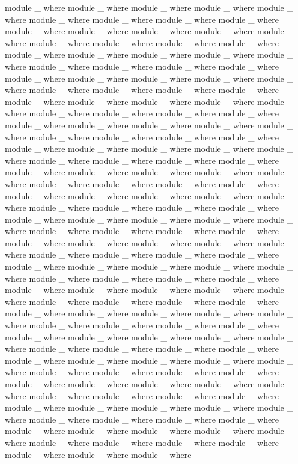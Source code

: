\documentclass{article}
\begin{document}
\begin{code}
module _ where
module _ where
module _ where
module _ where
module _ where
module _ where
module _ where
module _ where
module _ where
module _ where
module _ where
module _ where
module _ where
module _ where
module _ where
module _ where
module _ where
module _ where
module _ where
module _ where
module _ where
module _ where
module _ where
module _ where
module _ where
module _ where
module _ where
module _ where
module _ where
module _ where
module _ where
module _ where
module _ where
module _ where
module _ where
module _ where
module _ where
module _ where
module _ where
module _ where
module _ where
module _ where
module _ where
module _ where
module _ where
module _ where
module _ where
module _ where
module _ where
module _ where
module _ where
module _ where
module _ where
module _ where
module _ where
module _ where
module _ where
module _ where
module _ where
module _ where
module _ where
module _ where
module _ where
module _ where
module _ where
module _ where
module _ where
module _ where
module _ where
module _ where
module _ where
module _ where
module _ where
module _ where
module _ where
module _ where
module _ where
module _ where
module _ where
module _ where
module _ where
module _ where
module _ where
module _ where
module _ where
module _ where
module _ where
module _ where
module _ where
module _ where
module _ where
module _ where
module _ where
module _ where
module _ where
module _ where
module _ where
module _ where
module _ where
module _ where
module _ where
module _ where
module _ where
module _ where
module _ where
module _ where
module _ where
module _ where
module _ where
module _ where
module _ where
module _ where
module _ where
module _ where
module _ where
module _ where
module _ where
module _ where
module _ where
module _ where
module _ where
module _ where
module _ where
module _ where
module _ where
module _ where
module _ where
module _ where
module _ where
module _ where
module _ where
module _ where
module _ where
module _ where
module _ where
module _ where
module _ where
module _ where
module _ where
module _ where
module _ where
module _ where
module _ where
module _ where
module _ where
module _ where
module _ where
module _ where
module _ where
module _ where
module _ where
module _ where
module _ where
module _ where
module _ where
module _ where
module _ where
module _ where
module _ where
module _ where
module _ where
module _ where
module _ where
module _ where
module _ where
module _ where
module _ where
module _ where
module _ where
module _ where
module _ where
module _ where
module _ where
module _ where

\end{code}
\end{document}
